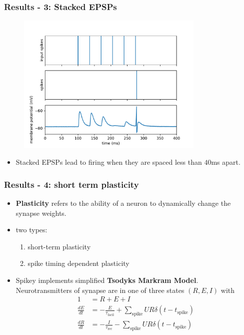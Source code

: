\documentclass{beamer}
\begin{document}
\begin{frame}
	\frametitle{Results - 3: Stacked EPSPs}
	\begin{figure}
		\includegraphics[width=0.8\textwidth]{figures/stacked_epsp.pdf}
	\end{figure}
	\begin{itemize}
		\item Stacked EPSPs lead to firing when they are spaced less than $40$ms apart.
	\end{itemize}
\end{frame}

\begin{frame}
    \frametitle{Results - 4: short term plasticity}
    \begin{itemize}
    		\item \textbf{Plasticity} refers to the ability of a neuron to dynamically
    		change the synapse weights.
    		\item two types:
    		\begin{enumerate}
    			\item short-term plasticity
    			\item spike timing dependent plasticity
    		\end{enumerate}
    		\item Spikey implements simplified \textbf{Tsodyks Markram Model}.
    		Neurotransmitters of synapse are in one of three states $(R,E,I)$ with
    		\begin{align}
			1 &= R + E + I  \\
			\frac{dE}{dt} &= - \frac{E}{\tau_\text{facil}} + \sum_\text{spike}
			UR\delta(t-t_\text{spike} ) \\
			\frac{dR}{dt} &= - \frac{I}{\tau_\text{rec}} - \sum_\text{spike}
			UR\delta(t-t_\text{spike} )
\end{align}
    \end{itemize}
\end{frame}
\end{document}
